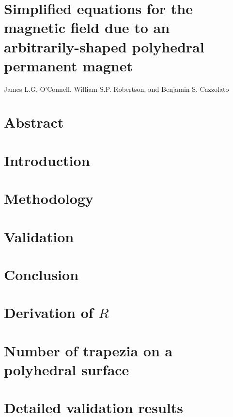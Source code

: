 %
%
\section*{\LARGE Simplified equations for the magnetic field due to an arbitrarily-shaped polyhedral permanent magnet}
James L.G. O'Connell, William S.P. Robertson, and Benjamin S. Cazzolato
\section*{Abstract}\label{sec:p2abstract}

\section{Introduction}\label{sec:p2introduction}

\section{Methodology}\label{sec:p2methodology}

\section{Validation}\label{sec:p2validation}

\section{Conclusion}\label{sec:p2conclusion}

\begin{subappendices}
\renewcommand{\thesection}{Appendix \arabic{chapter}.\Alph{section}}
\section{Derivation of \texorpdfstring{\(R\)}{R}}\label{sec:p2Rderivation}

\section{Number of trapezia on a polyhedral surface}\label{sec:p2numtrap}

\section{Detailed validation results}\label{sec:p2detailedResults}

\end{subappendices}
\clearpage
